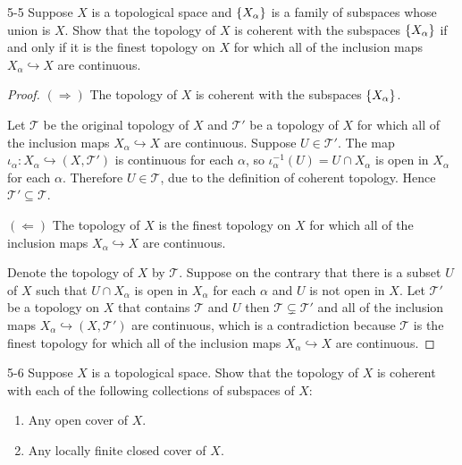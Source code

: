 \begin{problem}{5-5}\label{problem:5-5}
Suppose \( X \) is a topological space and \( \left\{{X_{\alpha}}\right\} \) is a family of subspaces whose union is \( X \). Show that the topology of \( X \) is coherent with the subspaces \( \left\{{X_{\alpha}}\right\} \) if and only if it is the finest topology on \( X \) for which all of the inclusion maps \( X_{\alpha} \hookrightarrow{} X \) are continuous.
\end{problem}

\begin{proof}
	\( (\Longrightarrow) \) The topology of \( X \) is coherent with the subspaces \( \left\{{X_{\alpha}}\right\} \).

	Let \( \mathscr{T} \) be the original topology of \( X \) and \( \mathscr{T}' \) be a topology of \( X \) for which all of the inclusion maps \( X_{\alpha} \hookrightarrow{} X \) are continuous. Suppose \( U \in \mathscr{T}' \). The map \( \iota_{\alpha}: X_{\alpha} \hookrightarrow{} (X, \mathscr{T}') \) is continuous for each \( \alpha \), so \( \iota_{\alpha}^{-1}(U) = U \cap X_{\alpha} \) is open in \( X_{\alpha} \) for each \( \alpha \). Therefore \( U \in \mathscr{T} \), due to the definition of coherent topology. Hence \( \mathscr{T}' \subseteq \mathscr{T} \).

	\( (\Longleftarrow) \) The topology of \( X \) is the finest topology on \( X \) for which all of the inclusion maps \( X_{\alpha} \hookrightarrow{} X \) are continuous.

	Denote the topology of \( X \) by \( \mathscr{T} \). Suppose on the contrary that there is a subset \( U \) of \( X \) such that \( U\cap X_{\alpha} \) is open in \( X_{\alpha} \) for each \( \alpha \) and \( U \) is not open in \( X \). Let \( \mathscr{T}' \) be a topology on \( X \) that contains \( \mathscr{T} \) and \( U \) then \( \mathscr{T} \subsetneq \mathscr{T}' \) and all of the inclusion maps \( X_{\alpha} \hookrightarrow{} (X, \mathscr{T}') \) are continuous, which is a contradiction because \( \mathscr{T} \) is the finest topology for which all of the inclusion maps \( X_{\alpha} \hookrightarrow{} X \) are continuous.
\end{proof}

\begin{problem}{5-6}\label{problem:5-6}
Suppose \( X \) is a topological space. Show that the topology of \( X \) is coherent with each of the following collections of subspaces of \( X \):
\begin{enumerate}[label={(\alph*)}]
	\item Any open cover of \( X \).
	\item Any locally finite closed cover of \( X \).
\end{enumerate}
\end{problem}

